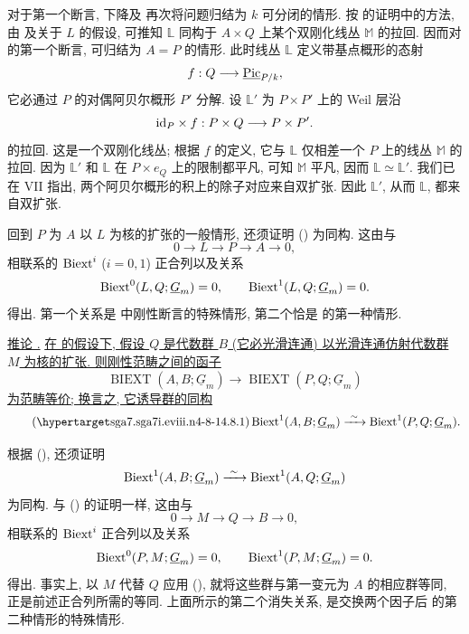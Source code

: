 对于第一个断言, 下降及  再次将问题归结为 $k$ 可分闭的情形. 按  的证明中的方法, 由  及关于 $L$ 的假设, 可推知 $\mathbb L$ 同构于 $A\times Q$ 上某个双刚化线丛 $\mathbb M$ 的拉回. 因而对  的第一个断言, 可归结为 $A=P$ 的情形. 此时线丛 $\mathbb L$ 定义带基点概形的态射
\[
 f:Q\longrightarrow\underline{\Pic}_{P/k},
\]
它必通过 $P$ 的对偶阿贝尔概形 $P'$ 分解. 设 $\mathbb L'$ 为 $P\times P'$ 上的 Weil 层沿
\[
 \mathrm{id}_P\times f:P\times Q\longrightarrow P\times P'.
\]
的拉回. 这是一个双刚化线丛; 根据 $f$ 的定义, 它与 $\mathbb L$ 仅相差一个 $P$ 上的线丛 $\mathbb M$ 的拉回. 因为 $\mathbb L'$ 和 $\mathbb L$ 在 $P\times e_Q$ 上的限制都平凡, 可知 $\mathbb M$ 平凡, 因而 $\mathbb L\simeq\mathbb L'$. 我们已在 VII  指出, 两个阿贝尔概形的积上的除子对应来自双扩张. 因此 $\mathbb L'$, 从而 $\mathbb L$, 都来自双扩张.

回到 $P$ 为 $A$ 以 $L$ 为核的扩张的一般情形, 还须证明 () 为同构. 这由与
\[
 0\longrightarrow L\longrightarrow P\longrightarrow A
 \longrightarrow0,
\]
相联系的 $\operatorname{Biext}^i$ ($i=0,1$) 正合列以及关系
\[
 \Biext^0(L,Q;\underline G_m)=0,
 \qquad
 \Biext^1(L,Q;\underline G_m)=0.
\]
得出. 第一个关系是  中刚性断言的特殊情形, 第二个恰是  的第一种情形.

\medskip
\noindent\underline{推论 .} \underline{在  的假设下, 假设 $Q$ 是代数群 $B$ (它必光滑连通) 以光滑连通仿射代数群 $M$ 为核的扩张. 则刚性范畴之间的函子}
\[
 \operatorname{BIEXT}(A,B;\underline G_m)
 \longrightarrow
 \operatorname{BIEXT}(P,Q;\underline G_m)
\]
\underline{为范畴等价; 换言之, 它诱导群的同构}
\begin{equation}\tag{\SGARefTarget{sga7.sga7i.eviii.n4-8-1}{4.8.1}}
 \Biext^1(A,B;\underline G_m)
 \xrightarrow{\ \sim\ }
 \Biext^1(P,Q;\underline G_m).
\end{equation}

根据 (), 还须证明
\[
 \Biext^1(A,B;\underline G_m)
 \xrightarrow{\ \sim\ }
 \Biext^1(A,Q;\underline G_m)
\]
为同构. 与 () 的证明一样, 这由与
\[
 0\longrightarrow M\longrightarrow Q\longrightarrow B
 \longrightarrow0,
\]
相联系的 $\operatorname{Biext}^i$ 正合列以及关系
\[
 \Biext^0(P,M;\underline G_m)=0,
 \qquad
 \Biext^1(P,M;\underline G_m)=0.
\]
得出. 事实上, 以 $M$ 代替 $Q$ 应用 (), 就将这些群与第一变元为 $A$ 的相应群等同, 正是前述正合列所需的等同. 上面所示的第二个消失关系, 是交换两个因子后  的第二种情形的特殊情形.

